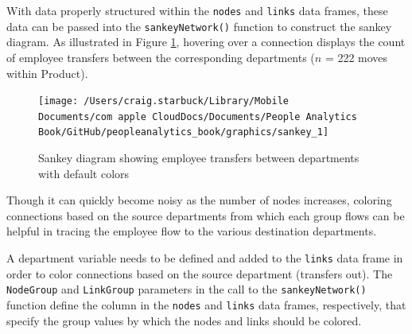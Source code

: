 \documentclass[
]{book}
\begin{document}
With data properly structured within the \texttt{nodes} and \texttt{links} data frames, these data can be passed into the \texttt{sankeyNetwork()} function to construct the sankey diagram. As illustrated in Figure \ref{fig:sankey-1}, hovering over a connection displays the count of employee transfers between the corresponding departments (\(n\) = 222 moves within Product).

\begin{figure}

{\centering \texttt{[image: /Users/craig.starbuck/Library/Mobile Documents/com~apple~CloudDocs/Documents/People Analytics Book/GitHub/peopleanalytics\_book/graphics/sankey\_1]} 

}

\caption{Sankey diagram showing employee transfers between departments with default colors}\label{fig:sankey-1}
\end{figure}

Though it can quickly become noisy as the number of nodes increases, coloring connections based on the source departments from which each group flows can be helpful in tracing the employee flow to the various destination departments.

A department variable needs to be defined and added to the \texttt{links} data frame in order to color connections based on the source department (transfers out). The \texttt{NodeGroup} and \texttt{LinkGroup} parameters in the call to the \texttt{sankeyNetwork()} function define the column in the \texttt{nodes} and \texttt{links} data frames, respectively, that specify the group values by which the nodes and links should be colored.
\end{document}
